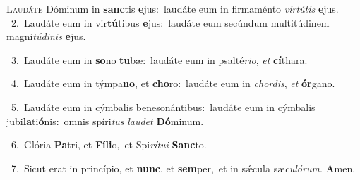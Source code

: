 \lettrine{\initial\textcolor{\initialcolor}{L}}{audáte} Dóminum in \textbf{sanc}\-tis \textbf{e}\-jus:~\star laudáte eum in firmaménto \textit{vir}\-\textit{tú}\textit{tis} \textbf{e}\-jus.\\
{\numbfont\textcolor{\numbcolor}{~2.}}~Laudáte eum in vir\-\textbf{tú}\-tibus \textbf{e}\-jus:~\star laudáte eum secúndum multitúdinem magni\-\textit{tú}\-\textit{di}\textit{nis} \textbf{e}\-jus.\par
{\numbfont\textcolor{\numbcolor}{~3.}}~Laudáte eum in \textbf{so}\-no \textbf{tu}\-bæ:~\star laudáte eum in psalté\-\textit{ri}\-\textit{o}, \textit{et} \textbf{cí}\-thara.\par
{\numbfont\textcolor{\numbcolor}{~4.}}~Laudáte eum in týmpa\-\textbf{no}\-, et \textbf{cho}\-ro:~\star laudáte eum in \textit{chor}\-\textit{dis}, \textit{et} \textbf{ór}\-gano.\par
{\numbfont\textcolor{\numbcolor}{~5.}}~Laudáte eum in cýmbalis benesonántibus:~\dagger laudáte eum in cýmbalis jubi\-\textbf{la}\-ti\-\textbf{ó}\-nis:~\star omnis spíri\textit{tus} \textit{lau}\-\textit{det} \textbf{Dó}\-minum.\par
{\numbfont\textcolor{\numbcolor}{~6.}}~Glória \textbf{Pa}\-tri, et \textbf{Fí}\-\textbf{li}o,~\star et Spi\-\textit{rí}\-\textit{tu}\textit{i} \textbf{Sanc}\-to.\par
{\numbfont\textcolor{\numbcolor}{~7.}}~Sicut erat in princípio, et \textbf{nunc}\-, et \textbf{sem}\-per,~\star et in sǽcula sæ\-\textit{cu}\-\textit{ló}\textit{rum}. \textbf{A}\-men.\par
